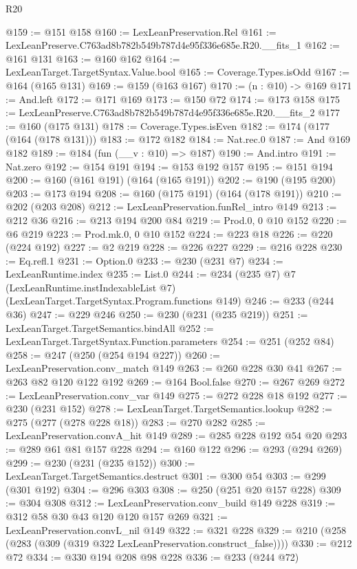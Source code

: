 \begin{lexlean}{R20}
\begin{coremodule}
@159 := @151 @158
@160 := LexLeanPreservation.Rel
@161 := LexLeanPreserve.C763ad8b782b549b787d4e95f336e685e.R20.__fits_1
@162 := @161 @131
@163 := @160 @162
@164 := LexLeanTarget.TargetSyntax.Value.bool
@165 := Coverage.Types.isOdd
@167 := @164 (@165 @131)
@169 := @159 (@163 @167)
@170 := (n : @10) -> @169
@171 := And.left
@172 := @171 @169
@173 := @150 @72
@174 := @173 @158
@175 := LexLeanPreserve.C763ad8b782b549b787d4e95f336e685e.R20.__fits_2
@177 := @160 (@175 @131)
@178 := Coverage.Types.isEven
@182 := @174 (@177 (@164 (@178 @131)))
@183 := @172 @182
@184 := Nat.rec.{0}
@187 := And @169 @182
@189 := @184 (fun (__v : @10) => @187)
@190 := And.intro
@191 := Nat.zero
@192 := @154 @191
@194 := @153 @192 @157
@195 := @151 @194
@200 := @160 (@161 @191) (@164 (@165 @191))
@202 := @190 (@195 @200)
@203 := @173 @194
@208 := @160 (@175 @191) (@164 (@178 @191))
@210 := @202 (@203 @208)
@212 := LexLeanPreservation.funRel_intro @149
@213 := @212 @36
@216 := @213 @194 @200 @84
@219 := Prod.{0, 0} @10 @152
@220 := @6 @219
@223 := Prod.mk.{0, 0} @10 @152
@224 := @223 @18
@226 := @220 (@224 @192)
@227 := @2 @219
@228 := @226 @227
@229 := @216 @228
@230 := Eq.refl.{1}
@231 := Option.{0}
@233 := @230 (@231 @7)
@234 := LexLeanRuntime.index
@235 := List.{0}
@244 := @234
    (@235 @7)
    @7
    (LexLeanRuntime.instIndexableList @7)
    (LexLeanTarget.TargetSyntax.Program.functions @149)
@246 := @233 (@244 @36)
@247 := @229 @246
@250 := @230 (@231 (@235 @219))
@251 := LexLeanTarget.TargetSemantics.bindAll
@252 := LexLeanTarget.TargetSyntax.Function.parameters
@254 := @251 (@252 @84)
@258 := @247 (@250 (@254 @194 @227))
@260 := LexLeanPreservation.conv_match @149
@263 := @260 @228 @30 @41
@267 := @263 @82 @120 @122 @192
@269 := @164 Bool.false
@270 := @267 @269
@272 := LexLeanPreservation.conv_var @149
@275 := @272 @228 @18 @192
@277 := @230 (@231 @152)
@278 := LexLeanTarget.TargetSemantics.lookup
@282 := @275 (@277 (@278 @228 @18))
@283 := @270 @282
@285 := LexLeanPreservation.convA_hit @149
@289 := @285 @228 @192 @54 @20
@293 := @289 @61 @81 @157 @228
@294 := @160 @122
@296 := @293 (@294 @269)
@299 := @230 (@231 (@235 @152))
@300 := LexLeanTarget.TargetSemantics.destruct
@301 := @300 @54
@303 := @299 (@301 @192)
@304 := @296 @303
@308 := @250 (@251 @20 @157 @228)
@309 := @304 @308
@312 := LexLeanPreservation.conv_build @149 @228
@319 := @312 @58 @30 @43 @120 @120 @157 @269
@321 := LexLeanPreservation.convL_nil @149
@322 := @321 @228
@329 := @210 (@258 (@283 (@309 (@319 @322 LexLeanPreservation.construct_false))))
@330 := @212 @72
@334 := @330 @194 @208 @98 @228
@336 := @233 (@244 @72)

\end{coremodule}
\end{lexlean}
